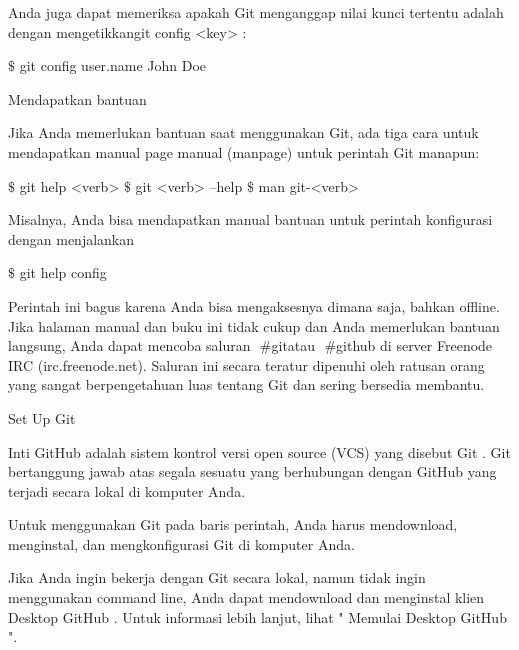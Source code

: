 \vspace{12pt}
\noindent 
Anda juga dapat memeriksa apakah Git menganggap nilai kunci tertentu adalah dengan mengetikkangit config <key> $  $: \par
\vspace{12pt}
\noindent 
  $  \$  $ git config user.name John Doe  \par
\vspace{12pt}
\noindent 
Mendapatkan bantuan \par
\vspace{12pt}
\noindent 
Jika Anda memerlukan bantuan saat menggunakan Git, ada tiga cara untuk mendapatkan manual page manual (manpage) untuk perintah Git manapun: \par
\vspace{12pt}
\noindent 
 $  \$  $ git help <verb>  $  \$  $ git <verb> --help  $  \$  $ man git-<verb>  \par
\vspace{12pt}
\noindent 
Misalnya, Anda bisa mendapatkan manual bantuan untuk perintah konfigurasi dengan menjalankan \par
\vspace{12pt}
\noindent 
  $  \$  $ git help config  \par
\vspace{12pt}
\noindent 
Perintah ini bagus karena Anda bisa mengaksesnya dimana saja, bahkan offline. $  $Jika halaman manual dan buku ini tidak cukup dan Anda memerlukan bantuan langsung, Anda dapat mencoba saluran $  $ $  \#  $gitatau $  $ $  \#  $github $  $di server Freenode IRC (irc.freenode.net). $  $Saluran ini secara teratur dipenuhi oleh ratusan orang yang sangat berpengetahuan luas tentang Git dan sering bersedia membantu. \par
\vspace{12pt}
\noindent 
Set Up Git \par
\vspace{12pt}
\noindent 
Inti GitHub adalah sistem kontrol versi open source (VCS) yang disebut $  $Git $  $. $  $Git bertanggung jawab atas segala sesuatu yang berhubungan dengan GitHub yang terjadi secara lokal di komputer Anda. \par
\vspace{12pt}
\noindent 
Untuk menggunakan Git pada baris perintah, Anda harus mendownload, menginstal, dan mengkonfigurasi Git di komputer Anda. \par
\vspace{12pt}
\noindent 
Jika Anda ingin bekerja dengan Git secara lokal, namun tidak ingin menggunakan command line, Anda dapat mendownload dan menginstal klien $  $Desktop GitHub $  $. $  $Untuk informasi lebih lanjut, lihat " $  $Memulai Desktop GitHub $  $". \par
